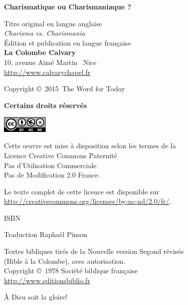 \newpage
\mbox{}
\vfill

{\scriptsize

{\bfseries Charismatique ou Charismaniaque ?}

Titre original en langue anglaise\frcolon{}\\
\emph{Charisma vs. Charismania} \\

Édition et publication en langue française\frcolon{}\\
 {\bfseries La Colombe Calvary}\\
 10, avenue Aimé Martin ~Nice\\
 \url{http://www.calvarychapel.fr}

Copyright \copyright{}~2015~The Word for Today

{\bfseries Certains droits réservés}

\ifluatex
  \includegraphics[width=6em]{images/by-nc-nd_eu}
\fi

Cette \oe{}uvre est mise à disposition selon les termes de la \\
 Licence Creative Commons Paternité \\
 \ocadr Pas d'Utilisation Commerciale \\
 \ocadr Pas de Modification 2.0 France.

Le texte complet de cette licence est disponible sur \\
 \url{http://creativecommons.org/licenses/by-nc-nd/2.0/fr/}.

ISBN~\isbn

Traduction\frcolon{} Raphaël Pinson

Textes bibliques tirés de la Nouvelle version Segond révisée \\
 (Bible à la Colombe), avec autorisation. \\
 Copyright \copyright{}~1978 Société biblique française \\
 \url{http://www.editionsbiblio.fr}

À Dieu soit la gloire!

}
\enlargethispage{\footskip}
\pagebreak


